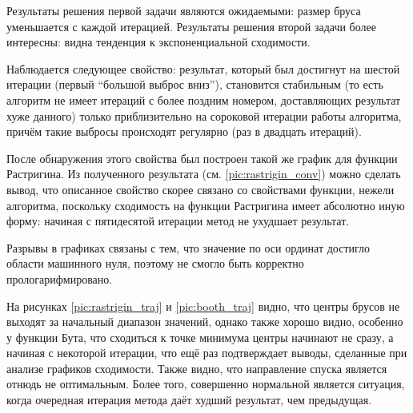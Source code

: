 Результаты решения первой задачи являются ожидаемыми: размер бруса уменьшается с каждой итерацией. Результаты решения второй задачи более интересны: видна тенденция к экспоненциальной сходимости.

Наблюдается следующее свойство: результат, который был достигнут на шестой итерации (первый ``большой выброс вниз''), становится стабильным (то есть алгоритм не имеет итераций с более поздним номером, доставляющих результат хуже данного) только приблизительно на сороковой итерации работы алгоритма, причём такие выбросы происходят регулярно (раз в двадцать итераций). 

После обнаружения этого свойства был построен такой же график для функции Растригина. Из полученного результата (см. \ref{pic:rastrigin_conv}) можно сделать вывод, что описанное свойство скорее связано со свойствами функции, нежели алгоритма, поскольку сходимость на функции Растригина имеет абсолютно иную форму: начиная с пятидесятой итерации метод не ухудшает результат.

Разрывы в графиках связаны с тем, что значение по оси ординат достигло области машинного нуля, поэтому не смогло быть корректно прологарифмировано.

На рисунках \ref{pic:rastrigin_traj} и \ref{pic:booth_traj} видно, что центры брусов не выходят за начальный диапазон значений, однако также хорошо видно, особенно у функции Бута, что сходиться к точке минимума центры начинают не сразу, а начиная с некоторой итерации, что ещё раз подтверждает выводы, сделанные при анализе графиков сходимости.
Также видно, что направление спуска является отнюдь не оптимальным. Более того, совершенно нормальной является ситуация, когда очередная итерация метода даёт худший результат, чем предыдущая.